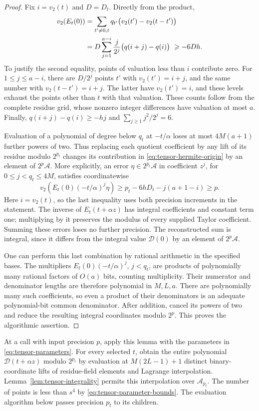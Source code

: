 \begin{proof}
Fix $i=v_2(t)$ and $D=D_t$.  Directly from the product,
\begin{align}
 v_2(E_t(0))
 &=\sum_{t'\ne0,t}q_{t'}\bigl(v_2(t')-v_2(t-t')\bigr)\notag\\
 &=D\sum_{j=1}^{a-i}\frac{j}{2^j}
                           \bigl(q(i+j)-q(i)\bigr)
 \ \ge -6Dh. \label{eq:tensor-hermite-loss}
\end{align}
To justify the second equality, points of valuation less than $i$
contribute zero.  For $1\le j\le a-i$, there are $D/2^j$ points $t'$ with
$v_2(t')=i+j$, and the same number with $v_2(t-t')=i+j$.
The latter have $v_2(t')=i$, and these levels exhaust the points
other than $t$ with that valuation.  These counts follow from the
complete residue grid, whose nonzero integer differences have
valuation at most $a$.  Finally,
$q(i+j)-q(i)\ge-hj$ and $\sum_{j\ge1}j^2/2^j=6$.

Evaluation of a polynomial of degree below $q_t$ at $-t/\alpha$
loses at most $4M(a+1)$ further powers of two.  Thus replacing
each quotient coefficient by any lift of its residue modulo
$2^{p_t}$ changes its contribution in
\eqref{eq:tensor-hermite-origin} by an element of $2^p\mathcal A$.
More explicitly, an error $\eta\in2^{p_t}\mathcal A$ in coefficient
$z^j$, for $0\le j<q_t\le4M$, satisfies coordinatewise
\[
 v_2\!\left(E_t(0)(-t/\alpha)^j\eta\right)
 \ge p_t-6hD_t-j(a+1-i)\ge p.
\]
Here $i=v_2(t)$, so the last inequality uses both precision
increments in the statement. The inverse of $E_t(t+\alpha z)$
has integral coefficients and constant term one; multiplying by it
preserves the modulus of every supplied Taylor coefficient.
Summing these errors loses no further precision.  The reconstructed
sum is integral, since it differs from the integral value $\mathcal D(0)$
by an element of $2^p\mathcal A$.

One can perform this last combination by rational arithmetic in the
specified bases.  The multipliers $E_t(0)(-t/\alpha)^j$,
$j<q_t$, are products of polynomially many rational factors of
$O(a)$ bits, counting multiplicity.  Their numerator and denominator
lengths are therefore polynomial in $M,L,a$.  There are polynomially
many such coefficients, so even a product of their denominators is
an adequate polynomial-bit common denominator.  After addition,
cancel its powers of two and reduce the resulting integral
coordinates modulo $2^p$.  This proves the algorithmic assertion.
\end{proof}

At a call with input precision $p$, apply this lemma with the
parameters in \eqref{eq:tensor-parameters}.  For every selected $t$,
obtain the entire polynomial $\mathcal D(t+\alpha z)$ modulo $2^{p_t}$ by
evaluation at $M(2L-1)+1$ distinct binary-coordinate lifts of
residue-field elements and Lagrange interpolation.  Lemma~\ref{lem:tensor-integrality} permits this
interpolation over $\mathcal A_{p_t}$.  The number of points is
less than $s^4$ by \eqref{eq:tensor-parameter-bounds}.
The evaluation algorithm below passes precision $p_t$ to its
children.

